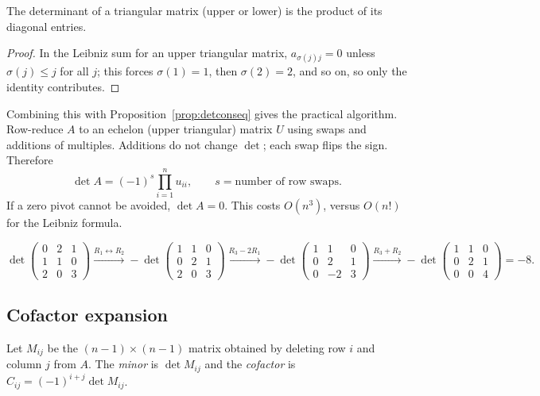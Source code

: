 \begin{proposition}\label{prop:dettri}
The determinant of a triangular matrix (upper or lower) is the product of its diagonal entries.
\end{proposition}

\begin{proof}
In the Leibniz sum for an upper triangular matrix, $a_{\sigma(j)j}=0$ unless $\sigma(j)\le j$ for all $j$; this forces $\sigma(1)=1$, then $\sigma(2)=2$, and so on, so only the identity contributes.
\end{proof}

Combining this with Proposition~\ref{prop:detconseq} gives the practical algorithm. Row-reduce $A$ to an echelon (upper triangular) matrix $U$ using swaps and additions of multiples. Additions do not change $\det$; each swap flips the sign. Therefore
\[ \det A=(-1)^{s}\prod_{i=1}^nu_{ii},\qquad s=\text{number of row swaps}. \]
If a zero pivot cannot be avoided, $\det A=0$. This costs $O(n^3)$, versus $O(n!)$ for the Leibniz formula.

\begin{example}
\[ \det\begin{pmatrix}0&2&1\\1&1&0\\2&0&3\end{pmatrix}\xrightarrow{R_1\leftrightarrow R_2}-\det\begin{pmatrix}1&1&0\\0&2&1\\2&0&3\end{pmatrix}\xrightarrow{R_3-2R_1}-\det\begin{pmatrix}1&1&0\\0&2&1\\0&-2&3\end{pmatrix}\xrightarrow{R_3+R_2}-\det\begin{pmatrix}1&1&0\\0&2&1\\0&0&4\end{pmatrix}=-8. \]
\end{example}

\subsection*{Cofactor expansion}

\begin{definition}
Let $M_{ij}$ be the $(n-1)\times(n-1)$ matrix obtained by deleting row $i$ and column $j$ from $A$. The \emph{minor} is $\det M_{ij}$ and the \emph{cofactor} is $C_{ij}=(-1)^{i+j}\det M_{ij}$.
\end{definition}

